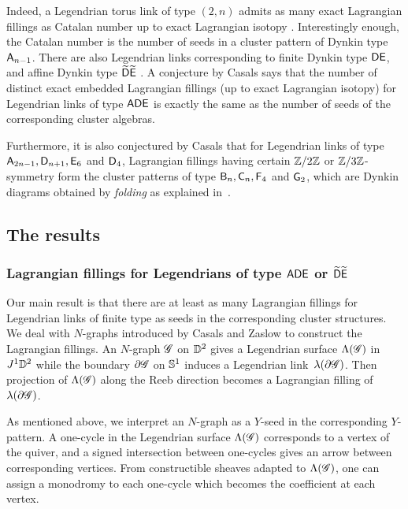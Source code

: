 Indeed, a Legendrian torus link of type $(2,n)$ admits as many exact
Lagrangian fillings as Catalan number up to exact Lagrangian isotopy \cite{Pan2017, STWZ2019,
TZ2018}. Interestingly enough, the Catalan number is the number of seeds in a
cluster pattern of Dynkin type $\mathsf{A}_{n-1}$. 
There are also Legendrian links corresponding to finite Dynkin type $\mathsf{D}\mathsf{E}$, and affine Dynkin type $\widetilde{\mathsf{D}}\widetilde{\mathsf{E}}$ \cite{GSW2020b}.
A conjecture by Casals \cite[Conjecture~5.1]{Cas2020} says that the number of
distinct exact embedded Lagrangian fillings (up to exact Lagrangian isotopy) for
Legendrian links of type $\mathsf{ADE}$ is exactly the same as the number of seeds
of the corresponding cluster algebras.

Furthermore, it is also conjectured by Casals \cite[Conjecture~5.4]{Cas2020} that for Legendrian links of type $\mathsf{A}_{2n-1}, \mathsf{D}_{n+1}, \mathsf{E}_6$ and $\mathsf{D}_4$, Lagrangian fillings having certain $\mathbb{Z}/2\mathbb{Z}$ or $\mathbb{Z}/3\mathbb{Z}$-symmetry form the cluster patterns of type $\mathsf{B}_n, \mathsf{C}_n, \mathsf{F}_4$ and $\mathsf{G}_2$, which are Dynkin diagrams obtained by \emph{folding} as explained in~\cite{FZ_Ysystem03}.


\subsection{The results}
\subsubsection{Lagrangian fillings for Legendrians of type $\mathsf{ADE}$ or $\widetilde{\mathsf{D}}\widetilde{\mathsf{E}}$}
Our main result is that there are at least as many Lagrangian fillings for
Legendrian links of finite type as seeds in the corresponding cluster structures. We deal with $N$-graphs introduced by Casals and Zaslow \cite{CZ2020} to
construct the Lagrangian fillings. An $N$-graph $\mathscr{G}$ on $\mathbb{D}^2$ gives
a Legendrian surface $\Lambda(\mathscr{G})$ in $J^1\mathbb{D}^2$ while the
boundary $\partial \mathscr{G}$ on $\mathbb{S}^1$ induces a Legendrian link~$\lambda(\partial \mathscr{G})$. Then projection of $\Lambda(\mathscr{G})$
along the Reeb direction becomes a Lagrangian filling of~$\lambda(\partial \mathscr{G})$.

As mentioned above, we interpret an $N$-graph as a $Y$-seed in the corresponding
$Y$-pattern. A one-cycle in the Legendrian surface
$\Lambda(\mathscr{G})$ corresponds to a vertex of the quiver, and a signed
intersection between one-cycles gives an arrow between corresponding
vertices. From constructible sheaves adapted to $\Lambda(\mathscr{G})$, one
can assign a monodromy to each one-cycle which becomes the coefficient at each vertex.

